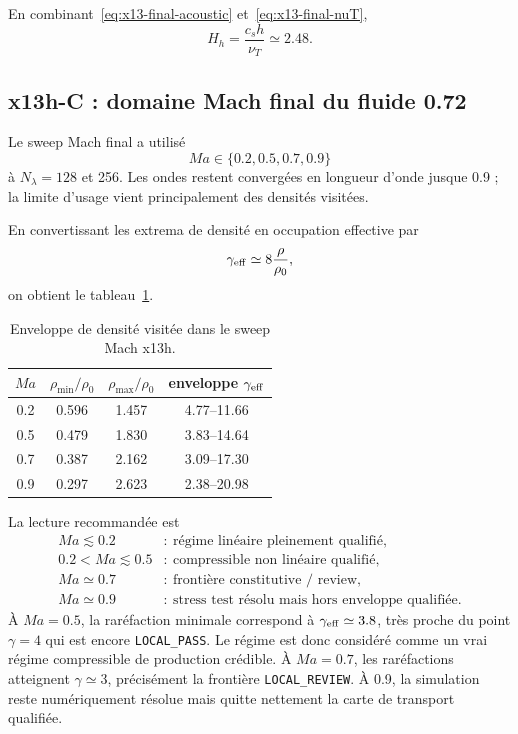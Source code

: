 \documentclass[11pt,a4paper]{article}
\begin{document}
En combinant~\eqref{eq:x13-final-acoustic} et~\eqref{eq:x13-final-nuT},
\begin{equation}
  \boxed{
  H_h
  =
  \frac{c_s h}{\nu_T}
  \simeq
  2.48.
  }
  \label{eq:x13-final-Hh}
\end{equation}

\subsection{x13h-C : domaine Mach final du fluide 0.72}

Le sweep Mach final a utilisé
\begin{equation}
  Ma\in\{0.2,0.5,0.7,0.9\}
\end{equation}
à $N_\lambda=128$ et 256. Les ondes restent convergées en longueur d'onde jusque 0.9 ; la limite d'usage vient principalement des densités visitées.

En convertissant les extrema de densité en occupation effective par
\begin{equation}
  \gamma_{\rm eff}
  \simeq
  8\frac{\rho}{\rho_0},
\end{equation}
on obtient le tableau~\ref{tab:x13-mach-envelope}.

\begin{table}[htbp]
\centering
\small
\caption{Enveloppe de densité visitée dans le sweep Mach x13h.}
\label{tab:x13-mach-envelope}
\begin{tabular}{cccc}
\toprule
$Ma$ & $\rho_{\min}/\rho_0$ & $\rho_{\max}/\rho_0$ & enveloppe $\gamma_{\rm eff}$ \\
\midrule
0.2 & 0.596 & 1.457 & 4.77--11.66 \\
0.5 & 0.479 & 1.830 & 3.83--14.64 \\
0.7 & 0.387 & 2.162 & 3.09--17.30 \\
0.9 & 0.297 & 2.623 & 2.38--20.98 \\
\bottomrule
\end{tabular}
\end{table}

La lecture recommandée est
\begin{equation}
  \boxed{
  \begin{array}{ll}
  Ma\lesssim0.2
  &:\ \text{régime linéaire pleinement qualifié},\\[0.2em]
  0.2<Ma\lesssim0.5
  &:\ \text{compressible non linéaire qualifié},\\[0.2em]
  Ma\simeq0.7
  &:\ \text{frontière constitutive / review},\\[0.2em]
  Ma\simeq0.9
  &:\ \text{stress test résolu mais hors enveloppe qualifiée}.
  \end{array}
  }
  \label{eq:x13-mach-status}
\end{equation}
À $Ma=0.5$, la raréfaction minimale correspond à $\gamma_{\rm eff}\simeq3.8$, très proche du point $\gamma=4$ qui est encore \texttt{LOCAL\_PASS}. Le régime est donc considéré comme un vrai régime compressible de production crédible. À $Ma=0.7$, les raréfactions atteignent $\gamma\simeq3$, précisément la frontière \texttt{LOCAL\_REVIEW}. À 0.9, la simulation reste numériquement résolue mais quitte nettement la carte de transport qualifiée.
\end{document}
